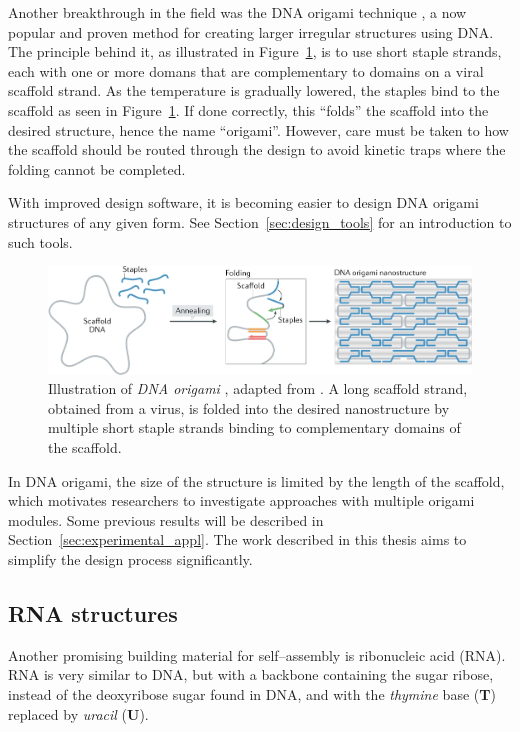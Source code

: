 
Another breakthrough in the field was the DNA origami technique \cite{rothemund2006folding}, a now popular and proven method for creating larger irregular structures using DNA. The principle behind it, as illustrated in Figure~\ref{fig:dnaOrigami}, is to use short staple strands, each with one or more domans that are complementary to domains on a viral scaffold strand. As the temperature is gradually lowered, the staples bind to the scaffold as seen in Figure~\ref{fig:dnaOrigami}. If done correctly, this ``folds'' the scaffold into the desired structure, hence the name ``origami''. However, care must be taken to how the scaffold should be routed through the design to avoid kinetic traps where the folding cannot be completed.

With improved design software, it is becoming easier to design DNA origami structures of any given form. See Section~\ref{sec:design_tools} for an introduction to such tools.



\begin{figure}
    \centering
    \includegraphics[width=\textwidth]{figures/dna_origami.png}
    \caption{Illustration of \emph{DNA origami} \cite{rothemund2006folding}, adapted from \cite{dey2021dna}. A long scaffold strand, obtained from a virus, is folded into the desired nanostructure by multiple short staple strands binding to complementary domains of the scaffold.
    }
    \label{fig:dnaOrigami}
\end{figure}

In DNA origami, the size of the structure is limited by the length of the scaffold, which motivates researchers to investigate approaches with multiple origami modules. Some previous results will be described in Section~\ref{sec:experimental_appl}. The work described in this thesis aims to simplify the design process significantly.

\subsection{RNA structures}
\label{sec:RNA_design}
Another promising building material for self--assembly is ribonucleic acid (RNA). RNA is very similar to DNA, but with a backbone containing the sugar ribose, instead of the deoxyribose sugar found in DNA, and with the \emph{thymine} base (\textbf{T}) replaced by \emph{uracil} (\textbf{U}).

